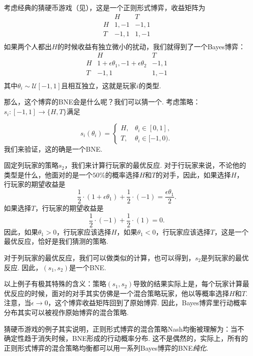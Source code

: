 \begin{example}[猜硬币游戏]
    考虑经典的猜硬币游戏（见），这是一个正则形式博弈，收益矩阵为
    \[
    \begin{array}{c|cc}
         &H&T  \\\hline
         H&1,-1 &-1,1\\
         T&-1,1&1,-1\\
    \end{array}
    \]
    如果两个人都出$H$的时候收益有独立微小的扰动，我们就得到了一个Bayes博弈：
    \[
    \begin{array}{c|cc}
         &H&T  \\\hline
         H&1+\epsilon\theta_1,-1+\epsilon\theta_2 &-1,1\\
         T&-1,1&1,-1\\
    \end{array}
    \]
    其中$\theta_i\sim\mathcal U[-1,1]$且相互独立，这就是玩家$i$的类型. 

    那么，这个博弈的BNE会是什么呢？我们可以猜一个. 考虑策略：$s_i:[-1,1]\to\{H,T\}$满足
    
    \[s_i(\theta_i)=\begin{cases}
    H,&\theta_i\in[0,1],\\
    T,&\theta_i\in[-1,0).
    \end{cases}\]
    我们来验证，这的确是一个BNE.

    固定列玩家的策略$s_2$，我们来计算行玩家的最优反应. 对于行玩家来说，不论他的类型是什么，他面对的是一个$50\%$的概率选择$H$和$T$的对手，因此，如果选择$H$，行玩家的期望收益是
    \[\frac{1}{2}\cdot (1+\epsilon\theta_1)+\frac{1}{2}\cdot(-1)=\frac{\epsilon\theta_1}{2}. \]
    如果选择$T$，行玩家的期望收益是
    \[\frac{1}{2}\cdot(-1)+\frac{1}{2}\cdot(1)=0. \]
    因此，如果$\theta_1>0$，行玩家应该选择$H$，如果$\theta_1<0$，行玩家应该选择$T$，这是一个最优反应，恰好是我们猜测的策略.

    对于列玩家的最优反应，我们可以做类似的计算，也可以得到，$s_2$是列玩家的最优反应. 因此，$(s_1,s_2)$是一个BNE.
\end{example}

以上例子有极其特殊的含义：策略$(s_1,s_2)$导致的结果实际上是，每个玩家计算最优反应的时候，面对的对手其实仿佛是一个混合策略玩家，他以等概率选择$H$和$T$. 注意，当$\epsilon\to 0$，这个博弈收益矩阵回到了原始博弈. 因此，Bayes博弈里行动概率分布其实可以被视作原始博弈的混合策略.

猜硬币游戏的例子其实说明，正则形式博弈的混合策略Nash均衡被理解为：当不确定性趋于消失时候，BNE形成的行动概率分布. 这不是偶然的，实际上，所有的正则形式博弈的混合策略均衡都可以用一系列Bayes博弈的BNE\textit{纯化}.

